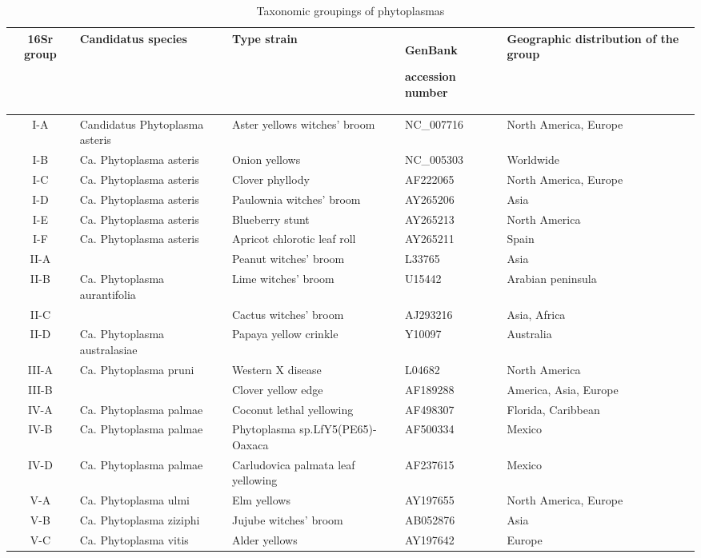 \begin{longtable}{|c| l| l | >{\centering\arraybackslash}p{3cm} | l| }
\caption{Taxonomic groupings of phytoplasmas \cite{p13}} \label{AllPhy}\\ \hline
16Sr group & Candidatus species & Type strain & GenBank 

accession number & Geographic distribution of the group \\ \hline \hline
I-A & Candidatus Phytoplasma asteris & Aster yellows witches' broom & NC\_007716 & North America, Europe\\ \hline
I-B & Ca. Phytoplasma asteris& Onion yellows& NC\_005303 &Worldwide \\ \hline
I-C & Ca. Phytoplasma asteris &Clover phyllody & AF222065 & North America, Europe \\ \hline
I-D & Ca. Phytoplasma asteris & Paulownia witches' broom & AY265206 & Asia \\ \hline
I-E & Ca. Phytoplasma asteris & Blueberry stunt & AY265213 & North America \\ \hline
I-F & Ca. Phytoplasma asteris & Apricot chlorotic leaf roll & AY265211 & Spain \\ \hline
II-A & & Peanut witches' broom &L33765 &Asia \\ \hline
II-B & Ca. Phytoplasma aurantifolia & Lime witches' broom & U15442 & Arabian peninsula \\ \hline
II-C & & Cactus witches' broom & AJ293216 & Asia, Africa \\ \hline
II-D & Ca. Phytoplasma australasiae & Papaya yellow crinkle & Y10097 & Australia \\ \hline
III-A & Ca. Phytoplasma pruni & Western X disease & L04682 & North America \\ \hline
III-B & & Clover yellow edge & AF189288 & America, Asia, Europe \\ \hline
IV-A & Ca. Phytoplasma palmae & Coconut lethal yellowing & AF498307 & Florida, Caribbean  \\ \hline
IV-B & Ca. Phytoplasma palmae & Phytoplasma sp.LfY5(PE65)-Oaxaca & AF500334 & Mexico  \\ \hline
IV-D & Ca. Phytoplasma palmae & Carludovica palmata leaf yellowing & AF237615 & Mexico  \\ \hline
V-A & Ca. Phytoplasma ulmi & Elm yellows & AY197655 & North America, Europe \\ \hline
V-B & Ca. Phytoplasma ziziphi & Jujube witches' broom & AB052876 & Asia  \\ \hline
V-C & Ca. Phytoplasma vitis & Alder yellows & AY197642 & Europe \\ \hline

\end{longtable}
